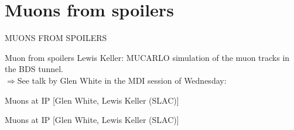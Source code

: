 \documentclass[xcolor={dvipsnames}]{beamer}
\begin{document}
\section{Muons from spoilers}
\begin{frame}
 \begin{center}
  \alert{\MakeUppercase{Muons from spoilers}}
 \end{center}
\end{frame}

\begin{frame}{Muon from spoilers}
 Lewis Keller: MUCARLO simulation of the muon tracks in the BDS tunnel.\\
 \alert{$\Rightarrow$See talk by Glen White in the MDI session of Wednesday:}
 \begin{center}
  \end{center}
\end{frame}
\begin{frame}{Muons at IP}
\small [Glen White, Lewis Keller (SLAC)]
  \begin{center}
  \end{center}
\end{frame}
\begin{frame}{Muons at IP}
\small [Glen White, Lewis Keller (SLAC)]
  \begin{center}
  \end{center}
\end{frame}
\end{document}
